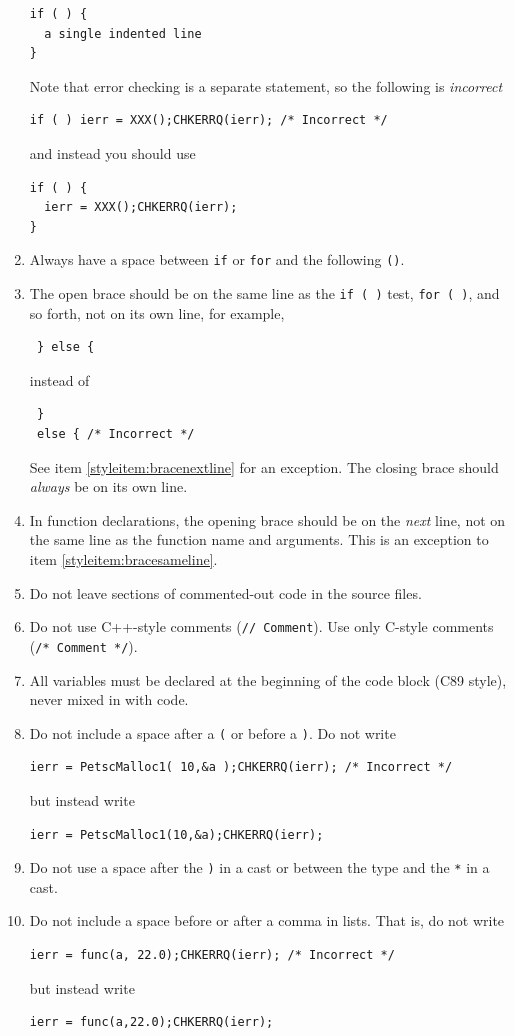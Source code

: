 \begin{enumerate}
\begin{lstlisting}
if ( ) {
  a single indented line
}
\end{lstlisting}
Note that error checking is a separate statement, so the following is {\em incorrect}
\begin{lstlisting}
if ( ) ierr = XXX();CHKERRQ(ierr); /* Incorrect */
\end{lstlisting}
and instead you should use
\begin{lstlisting}
if ( ) {
  ierr = XXX();CHKERRQ(ierr);
}
\end{lstlisting}
\item Always have a space between \lstinline{if} or \lstinline{for} and the following \lstinline{()}.
\item \label{styleitem:bracesameline} The open brace should be on the same line as the \lstinline{if ( )} test, \lstinline{for ( )}, and so forth, not on its own line, for example,
\begin{lstlisting}
 } else {
\end{lstlisting}
instead of
\begin{lstlisting}
 }
 else { /* Incorrect */
\end{lstlisting}
See item \ref{styleitem:bracenextline} for an exception.
 The closing brace should {\em always} be on its own line.
\item \label{styleitem:bracenextline} In function declarations, the opening brace should be on the {\em next} line, not on the same line as the function name and arguments.
  This is an exception to item \ref{styleitem:bracesameline}.
\item Do not leave sections of commented-out code in the source files.
\item Do not use C++-style comments (\lstinline{// Comment}). Use only C-style comments (\lstinline{/* Comment */}).
\item All variables must be declared at the beginning of the code block (C89 style), never mixed in with code.
\item Do not include a space after a \lstinline{(} or before a \lstinline{)}. Do not write
\begin{lstlisting}
ierr = PetscMalloc1( 10,&a );CHKERRQ(ierr); /* Incorrect */
\end{lstlisting}
but instead write
\begin{lstlisting}
ierr = PetscMalloc1(10,&a);CHKERRQ(ierr);
\end{lstlisting}
\item Do not use a space after the \lstinline{)} in a cast or between the type and the \lstinline{*} in a cast.
\item Do not include a  space before or after a comma in lists.
That is, do not write
\begin{lstlisting}
ierr = func(a, 22.0);CHKERRQ(ierr); /* Incorrect */
\end{lstlisting}
but instead write
\begin{lstlisting}
ierr = func(a,22.0);CHKERRQ(ierr);
\end{lstlisting}
\end{enumerate}


